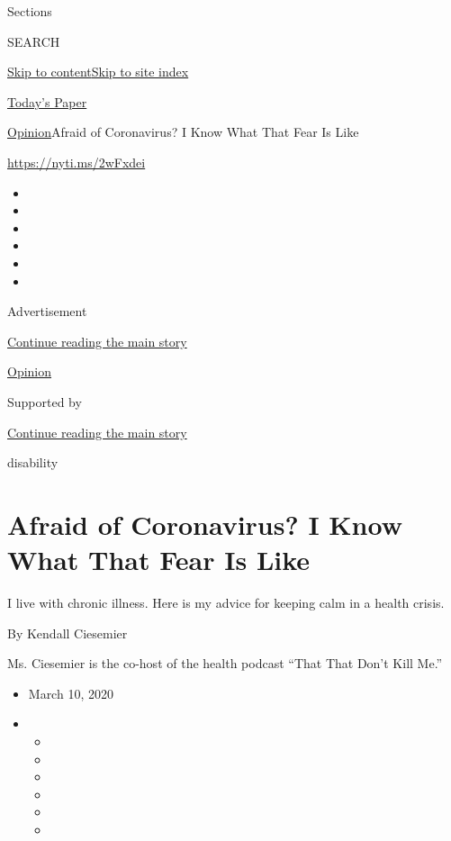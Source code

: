 Sections

SEARCH

\protect\hyperlink{site-content}{Skip to
content}\protect\hyperlink{site-index}{Skip to site index}

\href{https://myaccount.nytimes3xbfgragh.onion/auth/login?response_type=cookie\&client_id=vi}{}

\href{https://www.nytimes3xbfgragh.onion/section/todayspaper}{Today's
Paper}

\href{/section/opinion}{Opinion}\textbar{}Afraid of Coronavirus? I Know
What That Fear Is Like

\url{https://nyti.ms/2wFxdei}

\begin{itemize}
\item
\item
\item
\item
\item
\item
\end{itemize}

Advertisement

\protect\hyperlink{after-top}{Continue reading the main story}

\href{/section/opinion}{Opinion}

Supported by

\protect\hyperlink{after-sponsor}{Continue reading the main story}

disability

\hypertarget{afraid-of-coronavirus-i-know-what-that-fear-is-like}{%
\section{Afraid of Coronavirus? I Know What That Fear Is
Like}\label{afraid-of-coronavirus-i-know-what-that-fear-is-like}}

I live with chronic illness. Here is my advice for keeping calm in a
health crisis.

By Kendall Ciesemier

Ms. Ciesemier is the co-host of the health podcast ``That That Don't
Kill Me.''

\begin{itemize}
\item
  March 10, 2020
\item
  \begin{itemize}
  \item
  \item
  \item
  \item
  \item
  \item
  \end{itemize}
\end{itemize}

